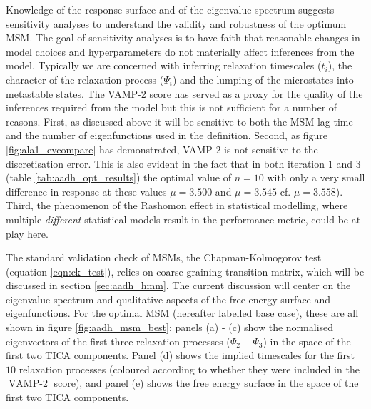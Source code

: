 Knowledge of the response surface and of the eigenvalue spectrum suggests sensitivity analyses to understand the validity and robustness of the optimum MSM.  The goal of sensitivity analyses is to have faith that reasonable changes in model choices and hyperparameters do not materially affect inferences from the model. Typically we are concerned with inferring relaxation timescales ($t_{i}$), the character of the relaxation process ($\Psi_{i}$) and the lumping of the microstates into metastable states. The VAMP-2 score has served as a proxy for the quality of the inferences required from the model but this is not sufficient  for a number of reasons.  First, as discussed above it will be sensitive to both the MSM lag time and the number of eigenfunctions used in the definition. Second, as figure \ref{fig:ala1_evcompare} has demonstrated, VAMP-2 is not sensitive to the discretisation error. This is also evident in the fact that in both iteration $1$ and $3$ (table \ref{tab:aadh_opt_results}) the optimal value of $n=10$ with only a very small difference in response at these values $\mu = 3.500$ and   $\mu=3.545$ cf. $\mu=3.558$). Third, the phenomenon of the Rashomon effect \cite{breiman2001} in statistical modelling, where  multiple \emph{different} statistical models result in the performance metric, could be at play here.

The standard validation check of MSMs, the Chapman-Kolmogorov test (equation \ref{eqn:ck_test}), relies on coarse graining transition matrix, which will be discussed in section \ref{sec:aadh_hmm}. The current discussion will center on the eigenvalue spectrum and qualitative aspects of the free energy surface and eigenfunctions. For the optimal MSM (hereafter labelled base case), these are all shown in figure \ref{fig:aadh_msm_best}: panels (a) - (c) show the normalised eigenvectors of the first three relaxation processes ($\Psi_{2} - \Psi_{3}$) in the space of the first two TICA components. Panel (d) shows the implied timescales for the first $10$ relaxation processes (coloured according to whether they were included in the $\operatorname{VAMP-2}$ score), and panel (e) shows the free energy surface in the space of the first two TICA components. 

